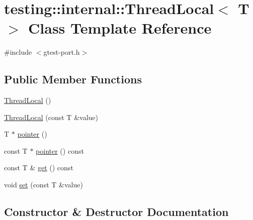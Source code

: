 \hypertarget{classtesting_1_1internal_1_1_thread_local}{}\section{testing\+::internal\+::Thread\+Local$<$ T $>$ Class Template Reference}
\label{classtesting_1_1internal_1_1_thread_local}


{\ttfamily \#include $<$gtest-\/port.\+h$>$}

\subsection*{Public Member Functions}
\begin{DoxyCompactItemize}
\item 
\mbox{\hyperlink{classtesting_1_1internal_1_1_thread_local_a106f3a3ad15d08f95f9887105d2a1af5}{Thread\+Local}} ()
\item 
\mbox{\hyperlink{classtesting_1_1internal_1_1_thread_local_a85610bdfdbc93a4c56215e0aad7da870}{Thread\+Local}} (const T \&value)
\item 
T $\ast$ \mbox{\hyperlink{classtesting_1_1internal_1_1_thread_local_a882f57fed4b074de83693c0c0fe62858}{pointer}} ()
\item 
const T $\ast$ \mbox{\hyperlink{classtesting_1_1internal_1_1_thread_local_a57e45bb60e3cd94abb04fa449e9f0367}{pointer}} () const
\item 
const T \& \mbox{\hyperlink{classtesting_1_1internal_1_1_thread_local_ac56aeb97991824979bf192c63d1466f8}{get}} () const
\item 
void \mbox{\hyperlink{classtesting_1_1internal_1_1_thread_local_ab5ebc7ba07426cef7167afa2a7707eb4}{set}} (const T \&value)
\end{DoxyCompactItemize}


\subsection{Constructor \& Destructor Documentation}
\mbox{\label{classtesting_1_1internal_1_1_thread_local_a106f3a3ad15d08f95f9887105d2a1af5}} 
